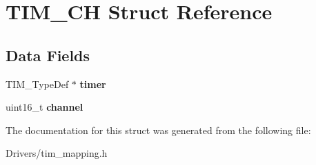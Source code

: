 \hypertarget{struct_t_i_m___c_h}{}\section{T\+I\+M\+\_\+\+CH Struct Reference}
\label{struct_t_i_m___c_h}
\subsection*{Data Fields}
\begin{DoxyCompactItemize}
\item 
\mbox{\label{struct_t_i_m___c_h_a5f2d7e0e880def3262a850626e3df17d}} 
T\+I\+M\+\_\+\+Type\+Def $\ast$ {\bfseries timer}
\item 
\mbox{\label{struct_t_i_m___c_h_a416297e763a4ef969dc4b11fbf607c8d}} 
uint16\+\_\+t {\bfseries channel}
\end{DoxyCompactItemize}


The documentation for this struct was generated from the following file\+:\begin{DoxyCompactItemize}
\item 
Drivers/tim\+\_\+mapping.\+h\end{DoxyCompactItemize}
